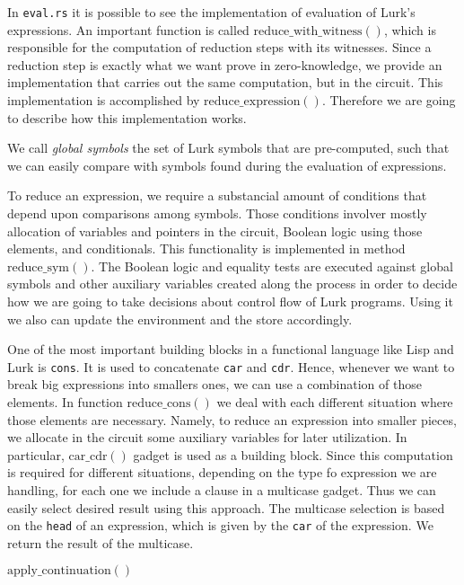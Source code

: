 \documentclass[10pt, english]{article}
\newcommand{\redexp}{\mathrm{reduce\_expression}}
\newcommand{\redwithwit}{\mathrm{reduce\_with\_witness}}
\newcommand{\redcons}{\mathrm{reduce\_cons}}
\newcommand{\redsym}{\mathrm{reduce\_sym}}
\newcommand{\applycont}{\mathrm{apply\_continuation}}
\newcommand{\carcdr}{\mathrm{car\_cdr}}
\newcommand{\makethunk}{\mathrm{make\_thunk}}
\begin{document}
In \verb|eval.rs| it is possible to see the implementation of evaluation of Lurk's expressions. An important function is called $\redwithwit()$, which is responsible for the computation of reduction steps with its witnesses. Since a reduction step is exactly what we want prove in zero-knowledge, we provide an implementation that carries out the same computation, but in the circuit. This implementation is accomplished by $\redexp()$. Therefore we are going to describe how this implementation works.

We call \textit{global symbols} the set of Lurk symbols that are pre-computed, such that we can easily compare with symbols found during the evaluation of expressions.

To reduce an expression, we require a substancial amount of conditions that depend upon comparisons among symbols. Those conditions involver mostly allocation of variables and pointers in the circuit, Boolean logic using those elements, and conditionals. This functionality is implemented in method $\redsym()$. The Boolean logic and equality tests are executed against global symbols and other auxiliary variables created along the process in order to decide how we are going to take decisions about control flow of Lurk programs. Using it we also can update the environment and the store accordingly.

One of the most important building blocks in a functional language like Lisp and Lurk is \verb|cons|. It is used to concatenate \verb|car| and \verb|cdr|. Hence, whenever we want to break big expressions into smallers ones, we can use a combination of those elements. In function $\redcons()$ we deal with each different situation where those elements are necessary. Namely, to reduce an expression into smaller pieces, we allocate in the circuit some auxiliary variables for later utilization. In particular, $\carcdr()$ gadget is used as a building block. Since this computation is required for different situations, depending on the type fo expression we are handling, for each one we include a clause in a multicase gadget. Thus we can easily select desired result using this approach. The multicase selection is based on the \verb|head| of an expression, which is given by the \verb|car| of the expression. We return the result of the multicase.



$\applycont()$
\end{document}
